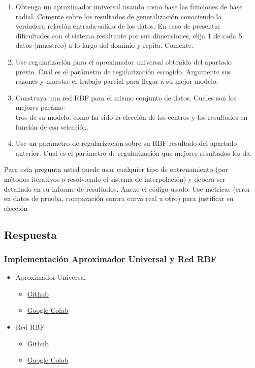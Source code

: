 \documentclass{article}
\theoremstyle{mytheoremstyle}
\theoremstyle{mytheoremstyle}
\theoremstyle{myproblemstyle}
\begin{document}
\begin{enumerate}[label=(\alph*)]
  \item Obtenga un aproximador universal usando como base las funciones de base radial. Comente sobre los resultados de generalización conociendo la verdadera relación entrada-salida de los datos. En caso de presentar dificultades con el sistema resultante por sus dimensiones, elija 1 de cada 5 datos (muestreo) a lo largo del dominio y repita. Comente.
  \item Use regularización para el aproximador universal obtenido del apartado previo. Cual es el parámetro de regularización escogido. Argumente sus razones y muestre el trabajo parcial para llegar a su mejor modelo.
  \item Construya una red RBF para el mismo conjunto de datos. Cuales son los mejores paráme-\\tros de  su modelo, como ha sido la elección de los centros y los resultados en función de esa selección.
  \item Use un parámetro de regularización sobre su RBF resultado del apartado anterior. Cual es el parámetro de regularización que mejores resultados les da.

\end{enumerate}
Para esta pregunta usted puede usar cualquier tipo de entrenamiento (por métodos iterativos o resolviendo el sistema de interpolación) y deberá ser detallado en su informe de resultados. Anexe el código usado. Use métricas (error en datos de prueba, comparación contra curva real u otro) para justificar su elección

\subsection*{Respuesta}

\subsubsection*{Implementación Aproximador Universal y Red RBF}

\begin{itemize}
  \item Aproximador Universal
        \begin{itemize}
          \item \href{https://github.com/LeoGCode/Tarea-4--Backpropagation}{Github}
          \item \href{https://colab.research.google.com/drive/1c8swOFZ_sL5bQSOi91ajNDod2Arv-0x6?usp=sharing}{Google Colab}
        \end{itemize}

  \item Red RBF
        \begin{itemize}
          \item \href{https://github.com/LeoGCode/Tarea-4--Backpropagation}{Github}
          \item \href{https://colab.research.google.com/drive/1c8swOFZ_sL5bQSOi91ajNDod2Arv-0x6?usp=sharing}{Google Colab}
        \end{itemize}
\end{itemize}
\end{document}
